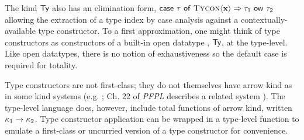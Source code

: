\documentclass[10pt,preprint]{sigplanconf}
\begin{document}
{ %

The kind $\textsf{Ty}$ also has an elimination form, ${\sf case}~\tau~{\sf of}~\textsc{Tycon}\langle{\textbf{x}}\rangle\Rightarrow\tau_1~{\sf ow}~\tau_2$ allowing the extraction of a type index by case analysis against a contextually-available type constructor. To a first approximation, one might think of type constructors as constructors of a built-in open datatype \cite{conf/ppdp/LohH06}, $\textsf{Ty}$, at the type-level. Like open datatypes, there is no notion of exhaustiveness so the default case is required for totality. %






 
 Type constructors are not first-class; they do not themselves have arrow kind as in some kind systems (e.g.  \cite{watkins2008specifying}; Ch. 22 of \emph{PFPL} describes a related system \cite{pfpl}). The type-level language does, however, include total functions of arrow kind, written $\kappa_1\rightarrow{\kappa_2}$. Type constructor application can be wrapped in a type-level function to emulate a first-class or uncurried version of a type constructor for convenience.%

}
\end{document}
